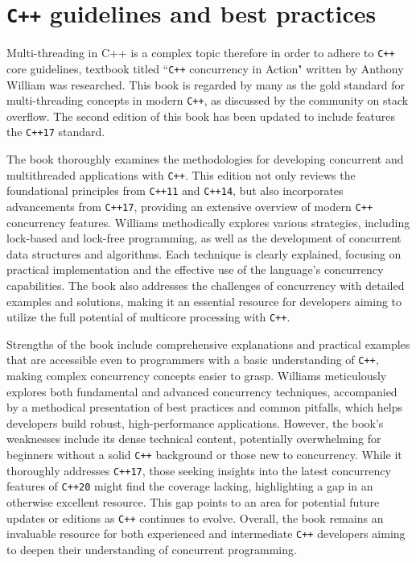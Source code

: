 \section{\texttt{C++} guidelines and best practices}

Multi-threading in C++ is a complex topic therefore in order to adhere to \texttt{C++} core guidelines,  textbook titled ``\texttt{C++} concurrency in Action" written by Anthony William was researched\cite{c++_concurrency_in_action}. This book is regarded by many as the gold standard for multi-threading concepts in modern \texttt{C++}, as discussed by the community on stack overflow\cite{c++_books_stackoverflow}. The second edition of this book has been updated to include features the \texttt{C++17} standard.

The book\cite{c++_concurrency_in_action} thoroughly examines the methodologies for developing concurrent and multithreaded applications with \texttt{C++}. This edition not only reviews the foundational principles from \texttt{C++11} and \texttt{C++14}, but also incorporates advancements from \texttt{C++17}, providing an extensive overview of modern \texttt{C++} concurrency features. Williams methodically explores various strategies, including lock-based and lock-free programming, as well as the development of concurrent data structures and algorithms. Each technique is clearly explained, focusing on practical implementation and the effective use of the language's concurrency capabilities. The book also addresses the challenges of concurrency with detailed examples and solutions, making it an essential resource for developers aiming to utilize the full potential of multicore processing with \texttt{C++}.

Strengths of the book\cite{c++_concurrency_in_action} include comprehensive explanations and practical examples that are accessible even to programmers with a basic understanding of \texttt{C++}, making complex concurrency concepts easier to grasp. Williams meticulously explores both fundamental and advanced concurrency techniques, accompanied by a methodical presentation of best practices and common pitfalls, which helps developers build robust, high-performance applications. However, the book's weaknesses include its dense technical content, potentially overwhelming for beginners without a solid \texttt{C++} background or those new to concurrency. While it thoroughly addresses \texttt{C++17}, those seeking insights into the latest concurrency features of \texttt{C++20} might find the coverage lacking, highlighting a gap in an otherwise excellent resource. This gap points to an area for potential future updates or editions as \texttt{C++} continues to evolve. Overall, the book remains an invaluable resource for both experienced and intermediate \texttt{C++} developers aiming to deepen their understanding of concurrent programming.

